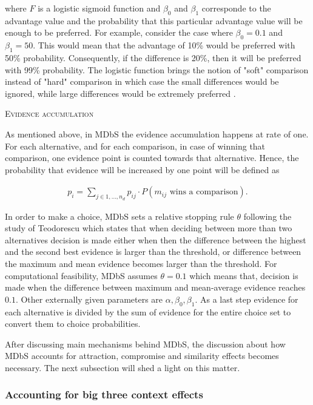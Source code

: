 \documentclass[a4paper,12pt]{article}
\newcommand{\citeyearonly}[1]{\citeyearpar{#1}}
\begin{document}
where $F$ is a logistic sigmoid function and $\beta_0$ and $\beta_1$ corresponde to the advantage value and the probability that this particular advantage value will be enough to be preferred. For example, consider the case where $\beta_0 = 0.1$ and $\beta_1 = 50$. This would mean that the advantage of 10\% would be preferred with 50\% probability. Consequently, if the difference is 20\%, then it will be preferred with 99\% probability. The logistic function brings the notion of "soft" comparison instead of "hard" comparison in which case the small differences would be ignored, while large differences would be extremely preferred \citep{noguchi2018multialternative}.

\textsc{Evidence accumulation}

As mentioned above, in MDbS the evidence accumulation happens at rate of one. For each alternative, and for each comparison, in case of winning that comparison, one evidence point is counted towards that alternative. Hence, the probability that evidence will be increased by one point will be defined as 

\begin{align}\label{probabilityOfEvidenceIncreasing}
    p_i = \sum_{j \in {1, \ldots, n_d}} p_{ij} \cdot P(m_{ij} \text{ wins a comparison}).
\end{align}

In order to make a choice, MDbS sets a relative stopping rule $\theta$ following the study of Teodorescu \citeyearonly{teodorescu2013disentangling} which states that when deciding between more than two alternatives decision is made either when then the difference between the highest and the second best evidence is larger than the threshold, or difference between the maximum and mean evidence becomes larger than the threshold. For computational feasibility, MDbS assumes $\theta = 0.1$ which means that, decision is made when the difference between maximum and mean-average evidence reaches $0.1$. Other externally given parameters are $\alpha, \beta_0, \beta_1$. As a last step evidence for each alternative is divided by the sum of evidence for the entire choice set to convert them to choice probabilities.

After discussing main mechanisms behind MDbS, the discussion about how MDbS accounts for attraction, compromise and similarity effects becomes necessary. The next subsection will shed a light on this matter.

\subsubsection{Accounting for big three context effects}
\end{document}
